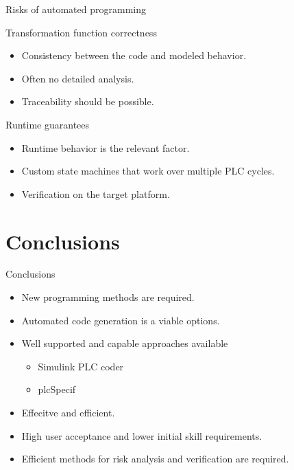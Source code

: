 \documentclass[18pt]{beamer}
\begin{document}
\begin{frame}{Risks of automated programming}

\begin{block}{Transformation function correctness}
	\begin{itemize}
		\item Consistency between the code and modeled behavior.
        \item Often no detailed analysis.
        \item Traceability should be possible.
	\end{itemize}
\end{block}
\pause
\begin{block}{Runtime guarantees}
    \begin{itemize}
        \item Runtime behavior is the relevant factor.
        \item Custom state machines that work over multiple PLC cycles.
        \item Verification on the target platform.
    \end{itemize}
\end{block}
\end{frame}

\section{Conclusions}
\begin{frame}{Conclusions}

\begin{itemize}
    \item New programming methods are required.
    \pause
    \item Automated code generation is a viable options.
    \pause
    \item Well supported and capable approaches available 
    \begin{itemize}
        \item Simulink PLC coder
        \item plcSpecif
    \end{itemize}
    \pause
    \item Effecitve and efficient.
    \pause
    \item High user acceptance and lower initial skill requirements.
    \pause
    \item Efficient methods for risk analysis and verification are required.
\end{itemize}
\end{frame}
\end{document}
